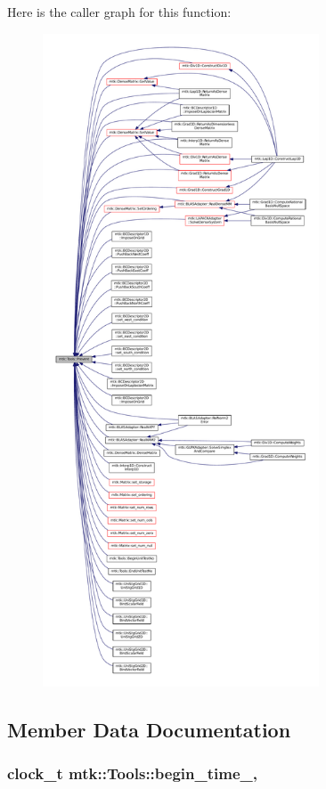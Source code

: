 Here is the caller graph for this function\+:\nopagebreak
\begin{figure}[H]
\begin{center}
\leavevmode
\includegraphics[height=550pt]{classmtk_1_1Tools_a332324c6f25e66be9dff48c5987a3b9f_icgraph}
\end{center}
\end{figure}




\subsection{Member Data Documentation}
\hypertarget{classmtk_1_1Tools_a4bd58d08397db42271ed9e2d3ecc9963}{
\subsubsection[{begin\+\_\+time\+\_\+}]{\setlength{\rightskip}{0pt plus 5cm}clock\+\_\+t mtk\+::\+Tools\+::begin\+\_\+time\+\_\+\hspace{0.3cm}{\ttfamily [static]}, {\ttfamily [private]}}}\label{classmtk_1_1Tools_a4bd58d08397db42271ed9e2d3ecc9963}



